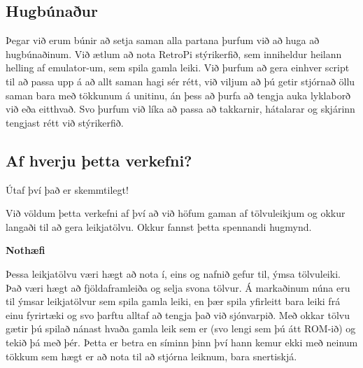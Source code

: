 \subsection{Hugbúnaður}

Þegar við erum búnir að setja saman alla partana þurfum við að huga að hugbúnaðinum. Við ætlum að nota RetroPi stýrikerfið, sem inniheldur heilann helling af emulator-um, sem spila gamla leiki. Við þurfum að gera einhver script til að passa upp á að allt saman hagi sér rétt, við viljum að þú getir stjórnað öllu saman bara með tökkunum á unitinu, án þess að þurfa að tengja auka lyklaborð við eða eitthvað. Svo þurfum við líka að passa að takkarnir, hátalarar og skjárinn tengjast rétt við stýrikerfið.

\subsection{Af hverju þetta verkefni?}

Útaf því það er skemmtilegt!

Við völdum þetta verkefni af því að við höfum gaman af tölvuleikjum og okkur langaði til að gera leikjatölvu. Okkur fannst þetta spennandi hugmynd.

\textbf{Nothæfi}

Þessa leikjatölvu væri hægt að nota í, eins og nafnið gefur til, ýmsa tölvuleiki. Það væri hægt að fjöldaframleiða og selja svona tölvur. Á markaðinum núna eru til ýmsar leikjatölvur sem spila gamla leiki, en þær spila yfirleitt bara leiki frá einu fyrirtæki og svo þarftu alltaf að tengja það við sjónvarpið. Með okkar tölvu gætir þú spilað nánast hvaða gamla leik sem er (svo lengi sem þú átt ROM-ið) og tekið þá með þér. Þetta er betra en síminn þinn því hann kemur ekki með neinum tökkum sem hægt er að nota til að stjórna leiknum, bara snertiskjá.